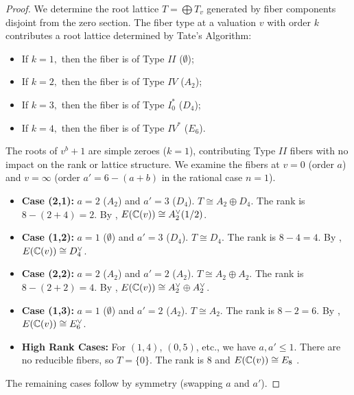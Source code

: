 \documentclass[11pt]{amsart}
\begin{document}
\begin{proof}
	We determine the root lattice $T = \bigoplus T_v$ generated by fiber components disjoint from the zero section. The fiber type at a valuation $v$ with order $k$ contributes a root lattice determined by Tate's Algorithm:
	\begin{itemize}
	\item		If $k=1,$ then the fiber is of Type $II$ ($\emptyset$); 	 
	\item		If	 $k=2,$ then the fiber is of Type $IV$ ($A_2$);
	\item		If	 $k=3,$ then the fiber is of Type $I_0^*$ ($D_4$);
	\item		If	 $k=4, $ then the fiber is of Type $IV^*$ ($E_6$).
		\end{itemize}
		
	The roots of $v^b+1$ are simple zeroes ($k=1$), contributing Type $II$ fibers with no impact on the rank or lattice structure. We examine the fibers at $v=0$ (order $a$) and $v=\infty$ (order $a' = 6-(a+b)$ in the rational case $n=1$).
	
	\begin{itemize}

		\item \textbf{Case (2,1):} $a=2$ ($A_2$) and $a'=3$ ($D_4$). $T \cong A_2 \oplus D_4$. The rank is $8 - (2+4) = 2$. By \cite[Table 8.2, No. 32]{Schuett2019}, $E({\mathbb C}(v)) \cong A_2^\vee(1/2)$.
		
		\item \textbf{Case (1,2):} $a=1$ ($\emptyset$) and $a'=3$ ($D_4$). $T \cong D_4$. The rank is $8 - 4 = 4$. By \cite[Table 8.2, No. 9]{Schuett2019}, $E({\mathbb C}(v)) \cong D_4^\vee$.
		
		\item \textbf{Case (2,2):} $a=2$ ($A_2$) and $a'=2$ ($A_2$). $T \cong A_2 \oplus A_2$. The rank is $8 - (2+2) = 4$. By \cite[Table 8.2, No. 11]{Schuett2019}, $E({\mathbb C}(v)) \cong A_2^\vee \oplus A_2^\vee$.
		
		\item \textbf{Case (1,3):} $a=1$ ($\emptyset$) and $a'=2$ ($A_2$). $T \cong A_2$. The rank is $8 - 2 = 6$. By \cite[Table 8.2, No. 3]{Schuett2019}, $E({\mathbb C}(v)) \cong E_6^\vee$.
		
		\item \textbf{High Rank Cases:} For $(1,4)$, $(0,5)$, etc., we have $a, a' \leq 1$. There are no reducible fibers, so $T = \{0\}$. The rank is $8$ and $E({\mathbb C}(v)) \cong E_8$ \cite[Table 8.2, No. 1]{Schuett2019}.
	\end{itemize}
	The remaining cases follow by symmetry (swapping $a$ and $a'$).
\end{proof}
\end{document}
